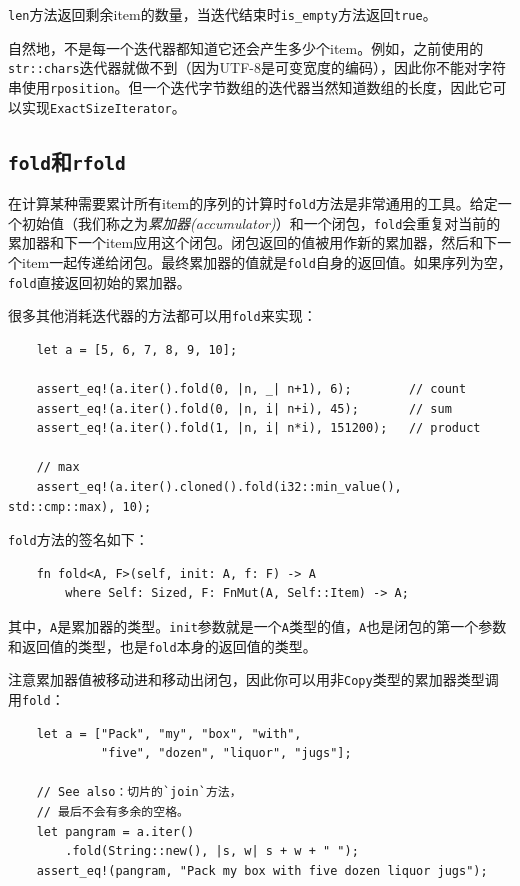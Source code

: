 \texttt{len}方法返回剩余item的数量，当迭代结束时\texttt{is\_empty}方法返回\texttt{true}。

自然地，不是每一个迭代器都知道它还会产生多少个item。例如，之前使用的\texttt{str::chars}迭代器就做不到（因为UTF-8是可变宽度的编码），因此你不能对字符串使用\texttt{rposition}。但一个迭代字节数组的迭代器当然知道数组的长度，因此它可以实现\texttt{ExactSizeIterator}。

\subsection{\texttt{fold}和\texttt{rfold}}
在计算某种需要累计所有item的序列的计算时\texttt{fold}方法是非常通用的工具。给定一个初始值（我们称之为\emph{累加器(accumulator)}）和一个闭包，\texttt{fold}会重复对当前的累加器和下一个item应用这个闭包。闭包返回的值被用作新的累加器，然后和下一个item一起传递给闭包。最终累加器的值就是\texttt{fold}自身的返回值。如果序列为空，\texttt{fold}直接返回初始的累加器。

很多其他消耗迭代器的方法都可以用\texttt{fold}来实现：
\begin{verbatim}
    let a = [5, 6, 7, 8, 9, 10];

    assert_eq!(a.iter().fold(0, |n, _| n+1), 6);        // count
    assert_eq!(a.iter().fold(0, |n, i| n+i), 45);       // sum
    assert_eq!(a.iter().fold(1, |n, i| n*i), 151200);   // product

    // max
    assert_eq!(a.iter().cloned().fold(i32::min_value(), std::cmp::max), 10);
\end{verbatim}

\texttt{fold}方法的签名如下：
\begin{verbatim}
    fn fold<A, F>(self, init: A, f: F) -> A
        where Self: Sized, F: FnMut(A, Self::Item) -> A;
\end{verbatim}

其中，\texttt{A}是累加器的类型。\texttt{init}参数就是一个\texttt{A}类型的值，\texttt{A}也是闭包的第一个参数和返回值的类型，也是\texttt{fold}本身的返回值的类型。

注意累加器值被移动进和移动出闭包，因此你可以用非\texttt{Copy}类型的累加器类型调用\texttt{fold}：
\begin{verbatim}
    let a = ["Pack", "my", "box", "with",
             "five", "dozen", "liquor", "jugs"];
    
    // See also：切片的`join`方法，
    // 最后不会有多余的空格。
    let pangram = a.iter()
        .fold(String::new(), |s, w| s + w + " ");
    assert_eq!(pangram, "Pack my box with five dozen liquor jugs");
\end{verbatim}

